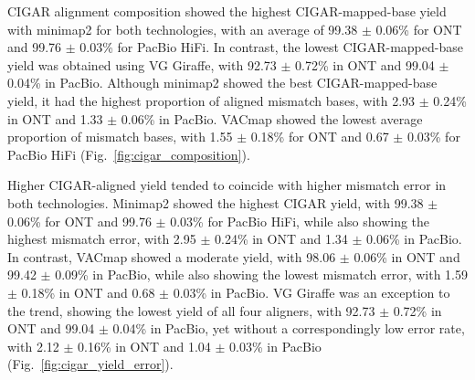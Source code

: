\documentclass[12pt, letterpaper]{article}
\begin{document}
CIGAR alignment composition showed the highest CIGAR-mapped-base yield with minimap2 for both technologies, with an average of 99.38 $\pm$ 0.06\% for ONT and 99.76 $\pm$ 0.03\% for PacBio HiFi. In contrast, the lowest CIGAR-mapped-base yield was obtained using VG Giraffe, with 92.73 $\pm$ 0.72\% in ONT and 99.04 $\pm$ 0.04\% in PacBio. Although minimap2 showed the best CIGAR-mapped-base yield, it had the highest proportion of aligned mismatch bases, with 2.93 $\pm$ 0.24\% in ONT and 1.33 $\pm$ 0.06\% in PacBio. VACmap showed the lowest average proportion of mismatch bases, with 1.55 $\pm$ 0.18\% for ONT and 0.67 $\pm$ 0.03\% for PacBio HiFi (Fig.~\ref{fig:cigar_composition}).

Higher CIGAR-aligned yield tended to coincide with higher mismatch error in both technologies. Minimap2 showed the highest CIGAR yield, with 99.38 $\pm$ 0.06\% for ONT and 99.76 $\pm$ 0.03\% for PacBio HiFi, while also showing the highest mismatch error, with 2.95 $\pm$ 0.24\% in ONT and 1.34 $\pm$ 0.06\% in PacBio. In contrast, VACmap showed a moderate yield, with 98.06 $\pm$ 0.06\% in ONT and 99.42 $\pm$ 0.09\% in PacBio, while also showing the lowest mismatch error, with 1.59 $\pm$ 0.18\% in ONT and 0.68 $\pm$ 0.03\% in PacBio. VG Giraffe was an exception to the trend, showing the lowest yield of all four aligners, with 92.73 $\pm$ 0.72\% in ONT and 99.04 $\pm$ 0.04\% in PacBio, yet without a correspondingly low error rate, with 2.12 $\pm$ 0.16\% in ONT and 1.04 $\pm$ 0.03\% in PacBio (Fig.~\ref{fig:cigar_yield_error}).

\end{document}
